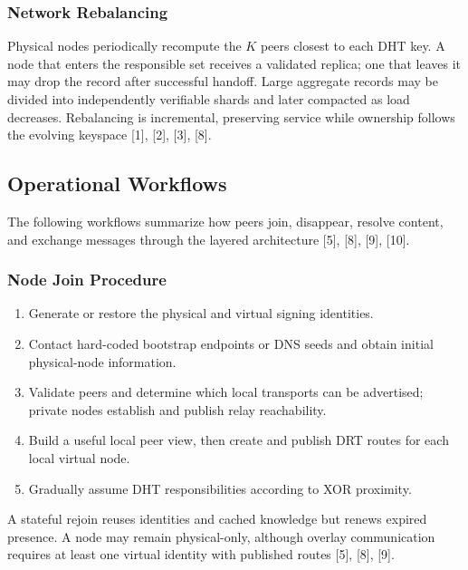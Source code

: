 \documentclass[12pt]{article}
\begin{document}
\subsubsection{Network Rebalancing}

Physical nodes periodically recompute the $K$ peers closest to each DHT key. A node
that enters the responsible set receives a validated replica; one that leaves it may
drop the record after successful handoff. Large aggregate records may be divided into
independently verifiable shards and later compacted as load decreases. Rebalancing is
incremental, preserving service while ownership follows the evolving keyspace [1],
[2], [3], [8].





\subsection{Operational Workflows}

The following workflows summarize how peers join, disappear, resolve content, and
exchange messages through the layered architecture [5], [8], [9], [10].

\subsubsection{Node Join Procedure}

\begin{enumerate}
    \item Generate or restore the physical and virtual signing identities.
    \item Contact hard-coded bootstrap endpoints or DNS seeds and obtain initial
    physical-node information.
    \item Validate peers and determine which local transports can be advertised;
    private nodes establish and publish relay reachability.
    \item Build a useful local peer view, then create and publish DRT routes for each
    local virtual node.
    \item Gradually assume DHT responsibilities according to XOR proximity.
\end{enumerate}

A stateful rejoin reuses identities and cached knowledge but renews expired presence.
A node may remain physical-only, although overlay communication requires at least one
virtual identity with published routes [5], [8], [9].
\end{document}

